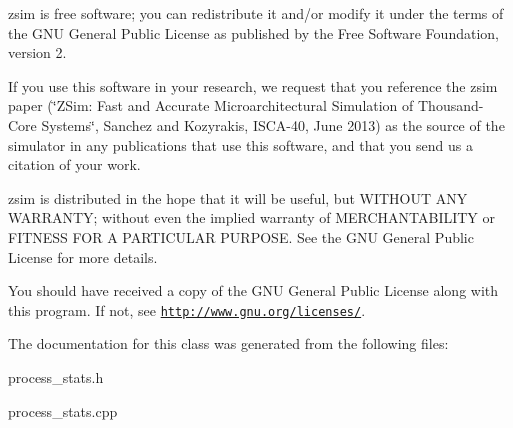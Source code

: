 zsim is free software; you can redistribute it and/or modify it under the terms of the G\-N\-U General Public License as published by the Free Software Foundation, version 2.

If you use this software in your research, we request that you reference the zsim paper (\char`\"{}\-Z\-Sim\-: Fast and Accurate Microarchitectural Simulation of
\-Thousand-\/\-Core Systems\char`\"{}, Sanchez and Kozyrakis, I\-S\-C\-A-\/40, June 2013) as the source of the simulator in any publications that use this software, and that you send us a citation of your work.

zsim is distributed in the hope that it will be useful, but W\-I\-T\-H\-O\-U\-T A\-N\-Y W\-A\-R\-R\-A\-N\-T\-Y; without even the implied warranty of M\-E\-R\-C\-H\-A\-N\-T\-A\-B\-I\-L\-I\-T\-Y or F\-I\-T\-N\-E\-S\-S F\-O\-R A P\-A\-R\-T\-I\-C\-U\-L\-A\-R P\-U\-R\-P\-O\-S\-E. See the G\-N\-U General Public License for more details.

You should have received a copy of the G\-N\-U General Public License along with this program. If not, see \href{http://www.gnu.org/licenses/}{\tt http\-://www.\-gnu.\-org/licenses/}. 

The documentation for this class was generated from the following files\-:\begin{DoxyCompactItemize}
\item 
process\-\_\-stats.\-h\item 
process\-\_\-stats.\-cpp\end{DoxyCompactItemize}
